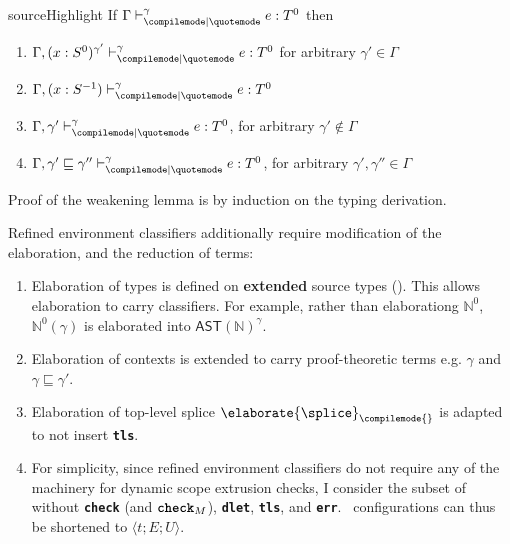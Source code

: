 \begin{lemma}{sourceHighlight}
  If $\rcqtypejudge{\gamma}{e}{T^0}$ then
  \begin{enumerate}
    \item $\rcqtypejudge[\Gamma, (x:S^0)^{\gamma'}]{\gamma}{e}{T^0}$ for arbitrary $\gamma' \in \Gamma$
    \item $\rcqtypejudge[\Gamma, (x:S^{-1})]{\gamma}{e}{T^0}$ 
    \item $\rcqtypejudge[\Gamma, \gamma']{\gamma}{e}{T^0}$, for arbitrary $\gamma' \notin \Gamma$
    \item $\rcqtypejudge[\Gamma, \gamma' \sqsubseteq \gamma'']{\gamma}{e}{T^0}$, for arbitrary $\gamma', \gamma'' \in \Gamma$
  \end{enumerate}
\end{lemma}
Proof of the weakening lemma is by induction on the typing derivation.

Refined environment classifiers additionally require modification of the elaboration, and the reduction of \coreLang{} terms:

\begin{enumerate}
  \item Elaboration of types is defined on \textbf{extended} source types (). This allows elaboration to carry classifiers. For example, rather than elaborationg $\mathbb{N}^0$, $\mathbb{N}^0(\gamma)$ is elaborated into $\textsf{AST}(\mathbb{N})^{\gamma}$.
  \item Elaboration of contexts is extended to carry proof-theoretic terms e.g. $\gamma$ and $\gamma \sqsubseteq \gamma'$.
  \item Elaboration of top-level splice $\elaborate{\splice}_{\compilemode{}}$ is adapted to not insert \textbf{\texttt{tls}}.
  \item For simplicity, since refined environment classifiers do not require any of the machinery for dynamic scope extrusion checks, I consider the subset of \coreLang{} without \textbf{\texttt{check}} (and $\textbf{\texttt{check}}_M$), \textbf{\texttt{dlet}}, \textbf{\texttt{tls}}, and \textbf{\texttt{err}}.\ \coreLang{} configurations can thus be shortened to $\langle t;E;U\rangle$.
\end{enumerate}

